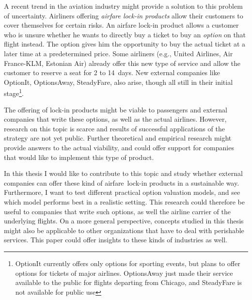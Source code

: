A recent trend in the aviation industry might provide a solution to this problem of uncertainty. Airliners offering \emph{airfare lock-in products} allow their customers to cover themselves for certain risks. An airfare lock-in product allows a customer who is unsure whether he wants to directly buy a ticket to buy an \emph{option} on that flight instead. The option gives him the opportunity to buy the actual ticket at a later time at a predetermined price. Some airliners (e.g., United Airlines, Air France-KLM, Estonian Air) already offer this new type of service and allow the customer to reserve a seat for 2 to 14~days. New external companies like OptionIt, OptionsAway, SteadyFare, also arise, though all still in their initial stage\footnote{OptionIt currently offers only options for sporting events, but plans to offer options for tickets of major airlines. OptionsAway just made their service available to the public for flights departing from Chicago, and SteadyFare is not available for public use}.

The offering of lock-in products might be viable to passengers and external companies that write these options, as well as the actual airlines. However, research on this topic is scarce and results of successful applications of the strategy are not yet public. Further theoretical and empirical research might provide answers to the actual viability, and could offer support for companies that would like to implement this type of product.

In this thesis I would like to contribute to this topic and study whether external companies can offer these kind of airfare~lock-in products in a sustainable way. Furthermore, I want to test different practical option valuation models, and see which model performs best in a realistic setting. This research could therefore be useful to companies that write such options, as well the airline carrier of the underlying flights. On a more general perspective, concepts studied in this thesis might also be applicable to other organizations that have to deal with perishable services. This paper could offer insights to these kinds of industries as well.
